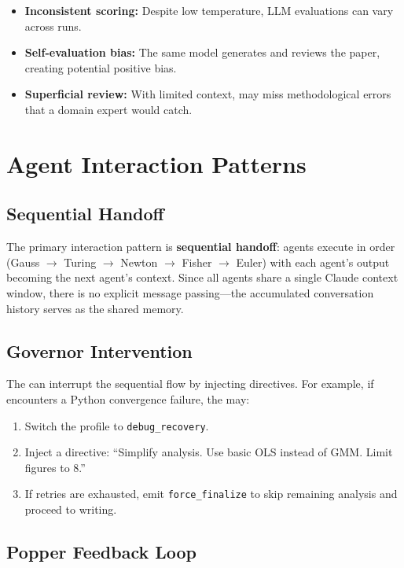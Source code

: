 \begin{itemize}
  \item \textbf{Inconsistent scoring:} Despite low temperature, LLM evaluations can vary across runs.
  \item \textbf{Self-evaluation bias:} The same model generates and reviews the paper, creating potential positive bias.
  \item \textbf{Superficial review:} With limited context, \popper may miss methodological errors that a domain expert would catch.
\end{itemize}

\section{Agent Interaction Patterns}
\label{sec:agents:interaction}

\subsection{Sequential Handoff}

The primary interaction pattern is \textbf{sequential handoff}: agents execute in order (Gauss $\to$ Turing $\to$ Newton $\to$ Fisher $\to$ Euler) with each agent's output becoming the next agent's context.
Since all agents share a single Claude context window, there is no explicit message passing---the accumulated conversation history serves as the shared memory.

\subsection{Governor Intervention}

The \governor can interrupt the sequential flow by injecting directives.
For example, if \fisher encounters a Python convergence failure, the \governor may:
\begin{enumerate}
  \item Switch the profile to \texttt{debug\_recovery}.
  \item Inject a directive: ``Simplify analysis. Use basic OLS instead of GMM. Limit figures to 8.''
  \item If retries are exhausted, emit \texttt{force\_finalize} to skip remaining analysis and proceed to writing.
\end{enumerate}

\subsection{Popper Feedback Loop}

